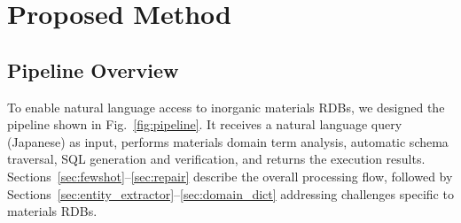 \documentclass{npj-compt.mater}
\begin{document}
\section{Proposed Method}
\label{sec:method}

\subsection{Pipeline Overview}

To enable natural language access to inorganic materials RDBs,
we designed the pipeline shown in Fig.~\ref{fig:pipeline}.
It receives a natural language query (Japanese) as input,
performs materials domain term analysis, automatic schema traversal,
SQL generation and verification, and returns the execution results.
Sections~\ref{sec:fewshot}--\ref{sec:repair} describe the overall processing flow,
followed by Sections~\ref{sec:entity_extractor}--\ref{sec:domain_dict}
addressing challenges specific to materials RDBs.
\end{document}
